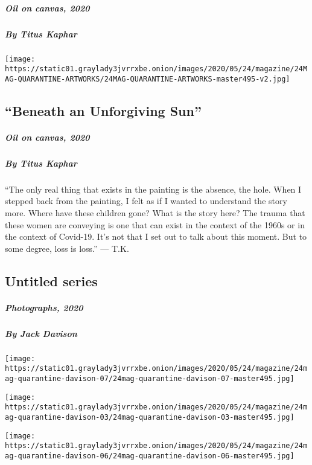 \hypertarget{oil-on-canvas-2020}{%
\subparagraph{Oil on canvas, 2020}\label{oil-on-canvas-2020}}

\hypertarget{by-titus-kaphar}{%
\subparagraph{By Titus Kaphar}\label{by-titus-kaphar}}

\texttt{[image: https://static01.graylady3jvrrxbe.onion/images/2020/05/24/magazine/24MAG-QUARANTINE-ARTWORKS/24MAG-QUARANTINE-ARTWORKS-master495-v2.jpg]}

\hypertarget{beneath-an-unforgiving-sun-1}{%
\subsection{``Beneath an Unforgiving
Sun''}\label{beneath-an-unforgiving-sun-1}}

\hypertarget{oil-on-canvas-2020-1}{%
\subparagraph{Oil on canvas, 2020}\label{oil-on-canvas-2020-1}}

\hypertarget{by-titus-kaphar-1}{%
\subparagraph{By Titus Kaphar}\label{by-titus-kaphar-1}}

``The only real thing that exists in the painting is the absence, the
hole. When I stepped back from the painting, I felt as if I wanted to
understand the story more. Where have these children gone? What is the
story here? The trauma that these women are conveying is one that can
exist in the context of the 1960s or in the context of Covid-19. It's
not that I set out to talk about this moment. But to some degree, loss
is loss.'' --- T.K.

\hypertarget{untitled-series}{%
\subsection{Untitled series}\label{untitled-series}}

\hypertarget{photographs-2020}{%
\subparagraph{Photographs, 2020}\label{photographs-2020}}

\hypertarget{by-jack-davison}{%
\subparagraph{By Jack Davison}\label{by-jack-davison}}

\texttt{[image: https://static01.graylady3jvrrxbe.onion/images/2020/05/24/magazine/24mag-quarantine-davison-07/24mag-quarantine-davison-07-master495.jpg]}

\texttt{[image: https://static01.graylady3jvrrxbe.onion/images/2020/05/24/magazine/24mag-quarantine-davison-03/24mag-quarantine-davison-03-master495.jpg]}

\texttt{[image: https://static01.graylady3jvrrxbe.onion/images/2020/05/24/magazine/24mag-quarantine-davison-06/24mag-quarantine-davison-06-master495.jpg]}

